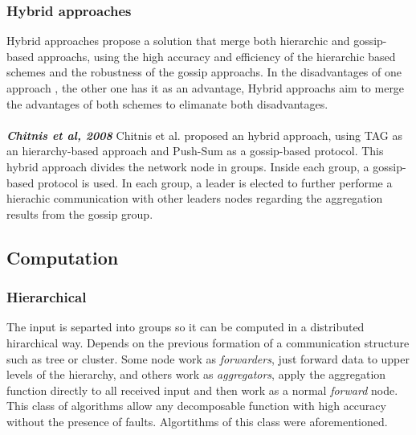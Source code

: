 \subsubsection{Hybrid approaches} 
Hybrid approaches propose a solution that merge both hierarchic and gossip-based approachs, using the high accuracy and efficiency of the hierarchic based schemes and the robustness of the gossip approachs. In the disadvantages of one approach , the other one has it as an advantage, Hybrid approachs aim to merge the advantages of both schemes to elimanate both disadvantages.\\
\\
\textbf{\textit{Chitnis et al, 2008}} Chitnis et al.\cite{chitnis2008aggregation} proposed an hybrid approach, using TAG as an hierarchy-based approach and Push-Sum as a gossip-based protocol. This hybrid approach divides the network node in groups. Inside each group, a gossip-based protocol is used. In each group, a leader is elected to further performe a hierachic communication with other  leaders nodes regarding the aggregation results from the gossip group. 

\subsection{Computation}
\subsubsection{Hierarchical}
The input is separted into groups so it can be computed in a distributed hirarchical way.  Depends on the previous formation of a communication structure such as tree or cluster. Some node work as \textit{forwarders}, just forward data to upper levels of the hierarchy, and others work as \textit{aggregators}, apply the aggregation function directly to all received input and then work as a normal \textit{forward} node. This class of algorithms allow any decomposable function with high accuracy without the presence of faults. Algortithms of this class were aforementioned.
